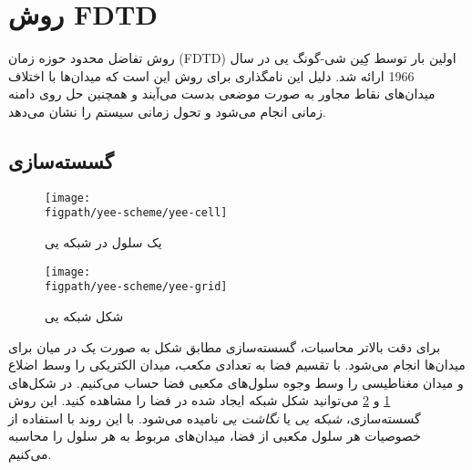 \documentclass[12pt,a4paper]{article}
\newcommand{\figpath}{../figures}
\begin{document}
	\section{روش FDTD}
	روش تفاضل محدود حوزه زمان (FDTD) اولین بار توسط کِین شی-گونگ یی در سال 1966 ارائه شد.
	دلیل این نامگذاری برای روش این است که میدان‌ها با اختلاف میدان‌های نقاط مجاور به صورت موضعی بدست می‌آیند و همچنین حل
	روی دامنه زمانی انجام می‌شود و تحول زمانی سیستم را نشان می‌دهد.
	\subsection{گسسته‌سازی}
	\begin{figure}
		\centering
		\texttt{[image: \\figpath/yee-scheme/yee-cell]}
		\caption{یک سلول در شبکه یی}
		\label{yee cell}
	\end{figure}
	\begin{figure}
		\centering
		\texttt{[image: \\figpath/yee-scheme/yee-grid]}
		\caption{شکل شبکه یی}
		\label{yee grid}
	\end{figure}
	برای دقت بالاتر محاسبات، گسسته‌سازی مطابق شکل به صورت یک در میان برای میدان‌ها انجام می‌شود.
	با تقسیم فضا به تعدادی مکعب، میدان الکتریکی را وسط اضلاع و میدان مغناطیسی را وسط وجوه سلول‌های مکعبی فضا حساب می‌کنیم.
	در شکل‌های \ref{yee cell} و \ref{yee grid} می‌توانید شکل شبکه ایجاد شده در فضا را مشاهده کنید.
	این روش گسسته‌سازی، \emph{شبکه یی} یا \emph{نگاشت یی} نامیده می‌شود.
	با این روند با استفاده از خصوصیات هر سلول مکعبی از فضا، میدان‌های مربوط به هر سلول را محاسبه می‌کنیم.
	
\end{document}
